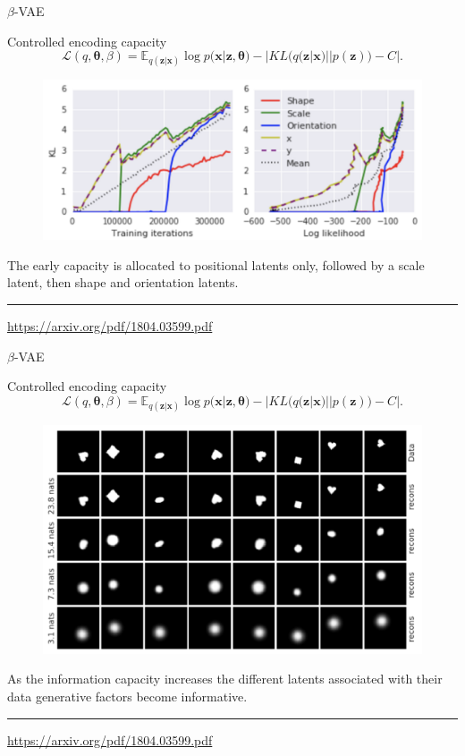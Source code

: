\documentclass{beamer}
\newcommand{\bx}{\mathbf{x}}
\newcommand{\bz}{\mathbf{z}}
\newcommand{\btheta}{\boldsymbol{\theta}}
\begin{document}
\begin{frame}{$\beta$-VAE}
\begin{block}{Controlled encoding capacity}
\vspace{-0.5cm}
\[
    \mathcal{L}(q, \btheta, \beta) = \mathbb{E}_{q(\bz | \bx)} \log p(\bx | \bz, \btheta) - | KL (q(\bz | \bx) || p(\bz)) - C|.
\]
\end{block}
\begin{figure}
    \centering
    \includegraphics[width=0.9\linewidth]{figs/betaVAE_7.png}
\end{figure}
The early capacity is allocated to positional latents only, followed by a scale latent, then shape and orientation latents.
\vspace{0.3cm}

\vfill
\hrule\medskip
{\scriptsize \href{https://arxiv.org/pdf/1804.03599.pdf}{https://arxiv.org/pdf/1804.03599.pdf}}
\end{frame}
\begin{frame}{$\beta$-VAE}
\begin{block}{Controlled encoding capacity}
\vspace{-0.5cm}
\[
    \mathcal{L}(q, \btheta, \beta) = \mathbb{E}_{q(\bz | \bx)} \log p(\bx | \bz, \btheta) - | KL (q(\bz | \bx) || p(\bz)) - C|.
\]
\vspace{-0.5cm}
\end{block}
\begin{figure}
    \centering
    \includegraphics[width=0.7\linewidth]{figs/betaVAE_8.png}
\end{figure}
As the information capacity increases the different latents associated with their data generative factors become informative.
\vspace{0.3cm}

\vfill
\hrule\medskip
{\scriptsize \href{https://arxiv.org/pdf/1804.03599.pdf}{https://arxiv.org/pdf/1804.03599.pdf}}
\end{frame}
\end{document}
